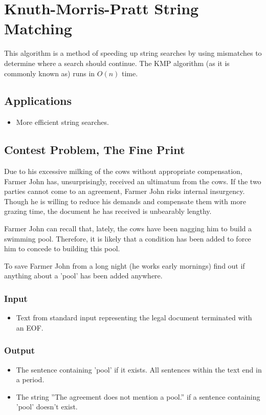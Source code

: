 \section{Knuth-Morris-Pratt String Matching}
This algorithm is a method of speeding up string searches by using mismatches to determine where a search should continue.
The KMP algorithm (as it is commonly known as) runs in $O(n)$ time.

\subsection{Applications}
\begin{itemize}
	\item More efficient string searches.
\end{itemize}

\subsection{Contest Problem, The Fine Print}
Due to his excessive milking of the cows without appropriate compensation, Farmer John has, unsurprisingly, received an ultimatum from the cows.
If the two parties cannot come to an agreement, Farmer John risks internal insurgency.
Though he is willing to reduce his demands and compensate them with more grazing time, the document he has received is unbearably lengthy.

Farmer John can recall that, lately, the cows have been nagging him to build a swimming pool.
Therefore, it is likely that a condition has been added to force him to concede to building this pool.

To save Farmer John from a long night (he works early mornings) find out if anything about a 'pool' has been added anywhere.

\subsubsection{Input}
\begin{itemize}
	\item Text from standard input representing the legal document terminated with an EOF.
\end{itemize}


\subsubsection{Output}
\begin{itemize}
	\item The sentence containing 'pool' if it exists. All sentences within the text end in a period.
	\item The string ''The agreement does not mention a pool.'' if a sentence containing 'pool' doesn't exist.
\end{itemize}


